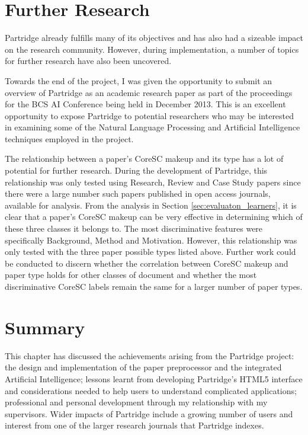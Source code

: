 \section{ Further Research }

Partridge already fulfills many of its objectives and has also had a sizeable
impact on the research community. However,  during implementation, a number of
topics for further research have also been uncovered.

Towards the end of the project, I was given the opportunity to submit an
overview of Partridge as an academic research paper as part of the proceedings
for the BCS AI Conference being held in December 2013. This is an excellent
opportunity to expose Partridge to potential researchers who may be interested
in examining some of the Natural Language Processing and Artificial
Intelligence techniques employed in the project.

The relationship between a paper's  CoreSC makeup and its type has a lot of
potential for further research. During the development of Partridge, this
relationship was only tested using Research, Review and Case Study papers since
there were a large number such papers published in open access journals,
available for analysis. From the analysis in Section
\ref{sec:evaluaton_learners}, it is clear that a paper's CoreSC makeup can be
very effective in determining which of these three classes it belongs to. The
most discriminative features were specifically Background, Method and
Motivation. However, this relationship was only tested with the three paper
possible types listed above. Further work could be conducted to discern whether
the correlation between CoreSC makeup and paper type holds for other classes of
document and whether the most discriminative CoreSC labels remain the same for
a larger number of paper types.

\section{ Summary }

This chapter has discussed the achievements arising from the Partridge project:
the design and implementation of the paper preprocessor and the integrated
Artificial Intelligence; lessons learnt from developing Partridge's HTML5
interface and considerations needed to help users to understand complicated
applications; professional and personal development through my relationship
with my supervisors. Wider impacts of Partridge include a growing number of
users and interest from one of the larger research journals that Partridge
indexes.

